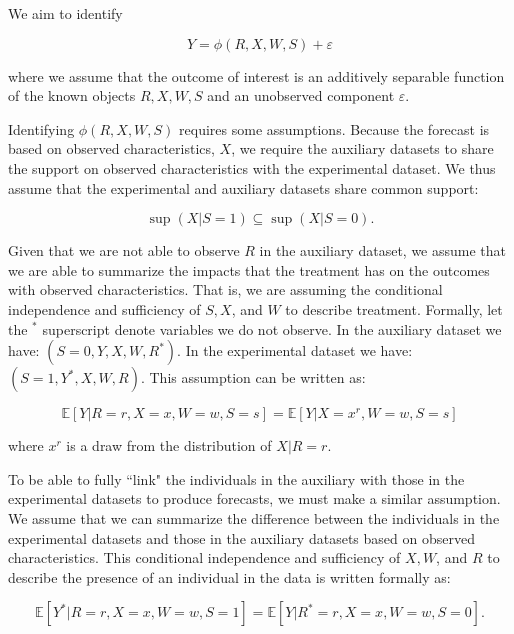 We aim to identify

\begin{equation}
Y = \phi \left( R, X, W, S \right) + \varepsilon \label{eq:forecast-param}
\end{equation}

\noindent where we assume that the outcome of interest is an additively separable function of the known objects $R, X, W, S$ and an unobserved component $\varepsilon$.

Identifying $\phi \left( R, X, W, S \right)$ requires some assumptions. Because the forecast is based on observed characteristics, $X$, we require the auxiliary datasets to share the support on observed characteristics with the experimental dataset. We thus assume that the experimental and auxiliary datasets share common support:

\begin{equation}
\sup \left( X | S = 1 \right) \subseteq \sup \left( X | S = 0 \right).
\end{equation}

Given that we are not able to observe $R$ in the auxiliary dataset, we assume that we are able to summarize the impacts that the treatment has on the outcomes with observed characteristics. That is, we are assuming the conditional independence and sufficiency of $S, X$, and $W$ to describe treatment. Formally, let the $^{*}$ superscript denote variables we do not observe. In the auxiliary dataset we have: $\left( S = 0, Y, X, W, R^* \right)$. In the experimental dataset we have: $\left( S = 1, Y^*, X, W, R \right)$. This assumption can be written as:

\begin{equation}
\mathbb{E} \left[ Y | R = r, X = x, W = w, S = s\right] =  \mathbb{E} \left[ Y | X = x^r, W = w, S = s\right]
\end{equation}

\noindent where $x^r$ is a draw from the distribution of $X | R = r$.

To be able to fully ``link" the individuals in the auxiliary with those in the experimental datasets to produce forecasts, we must make a similar assumption. We assume that we can summarize the difference between the individuals in the experimental datasets and those in the auxiliary datasets based on observed characteristics. This conditional independence and sufficiency of $X, W$, and $R$ to describe the presence of an individual in the data is written formally as:

\begin{equation}
\mathbb{E} \left[ Y^* | R = r, X = x, W = w, S = 1 \right] = \mathbb{E} \left[ Y | R^* = r , X = x, W = w, S = 0\right].
\end{equation}

